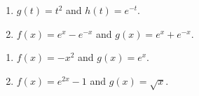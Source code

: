 \documentclass{ximera}
\begin{document}
\begin{multicols}{2}

\begin{enumerate}
\setcounter{enumi}{\value{HW}}


\item   $g(t) = t^2$ and $h(t) = e^{-t}$.
\item   $f(x) = e^{x} - e^{-x}$ and $g(x) = e^{x}+e^{-x}$.


\setcounter{HW}{\value{enumi}}
\end{enumerate}

\end{multicols}

\begin{multicols}{2}

  \begin{enumerate}
\setcounter{enumi}{\value{HW}}

\item   $f(x) = -x^2$ and $g(x) = e^{x}$.
\item   $f(x) = e^{2x} -1$ and $g(x) = \sqrt{x}$.  

\setcounter{HW}{\value{enumi}}
\end{enumerate}

\end{multicols}
\end{document}
